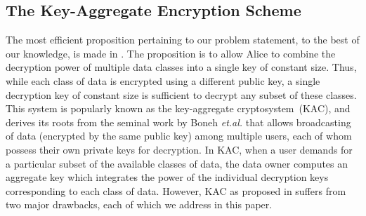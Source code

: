 % 


\subsection{The Key-Aggregate Encryption Scheme}
\label{subsec:KAC_orig}

The most efficient proposition pertaining to our problem statement, to the best of our knowledge, is made in \cite{chu2014key}. The proposition is to allow Alice to combine the decryption power of multiple data classes into a single key of constant size. Thus, while each class of data is encrypted using a different public key, a single decryption key of constant size is sufficient to decrypt any subset of these classes. This system is popularly known as the key-aggregate cryptosystem~(KAC), and derives its roots from the seminal work by Boneh \textit{et.al.} \cite{boneh2005collusion} that allows broadcasting of data (encrypted by the same public key) among multiple users, each of whom possess their own private keys for decryption. In KAC, when a user demands for a particular subset of the available classes of data, the data owner computes an aggregate key which integrates the power of the individual decryption keys corresponding to each class of data. However, KAC as proposed in \cite{chu2014key} suffers from two major drawbacks, each of which we address in this paper. 


